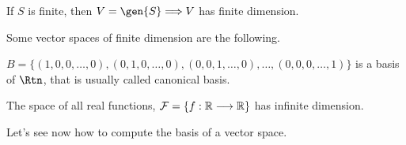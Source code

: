 \begin{remark}
    If $S$ is finite, then $V = \gen{S}\implies V$ has finite dimension.
\end{remark}

Some vector spaces of finite dimension are the following.

\begin{example}
    $B = \{\left( 1, 0, 0, \ldots, 0 \right) , \left( 0, 1, 0, \ldots, 0 \right) , \left( 0, 0, 1, \ldots, 0
    \right), \ldots, \left( 0, 0, 0, \ldots, 1 \right) \} $ is a basis of $\Rtn$, that is usually called
    canonical basis.
\end{example}

\begin{example}
    The space of all real functions, $\mathcal{F} = \{f : \mathbb{R}\longrightarrow \mathbb{R}\}$ has infinite dimension.
\end{example}

Let's see now how to compute the basis of a vector space.
